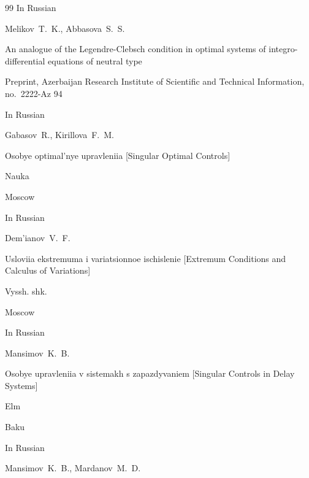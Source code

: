 \begin{thebibliography}{99}
\lang In Russian

\by Melikov~T.~K., Abbasova~S.~S.


\preprint An analogue of the Legendre-Clebsch condition in optimal systems of integro-differential equations of neutral type

\preprintinfo Preprint, Azerbaijan Research Institute of Scientific and Technical Information, no.~2222-Az 94








\lang In Russian

\by Gabasov~R., Kirillova~F.~M.

\book Osobye optimal'nye upravleniia \rm [Singular Optimal Controls]


\publ Nauka

\publaddr Moscow







\lang In Russian

\by Dem'ianov~V.~F.

\book Usloviia ekstremuma i variatsionnoe ischislenie \rm [Extremum Conditions and Calculus of Variations]


\publ Vyssh. shk.

\publaddr Moscow





\lang In Russian

\by Mansimov~K.~B. 

\book Osobye upravleniia v sistemakh s zapazdyvaniem \rm [Singular Controls in Delay Systems]


\publ Elm

\publaddr Baku







\lang In Russian

\by Mansimov~K.~B., Mardanov~M.~D.


\end{thebibliography}

